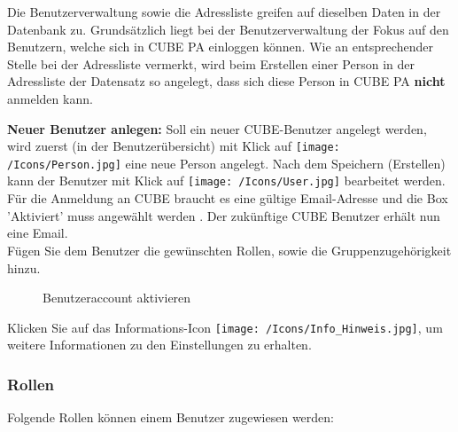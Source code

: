 Die Benutzerverwaltung sowie die Adressliste greifen auf dieselben Daten in der Datenbank zu. Grundsätzlich liegt bei der Benutzerverwaltung der Fokus auf den Benutzern, welche sich in CUBE PA einloggen können. Wie an entsprechender Stelle bei der Adressliste vermerkt, wird beim Erstellen einer Person in der Adressliste der Datensatz so angelegt, dass sich diese Person in CUBE PA \textbf{nicht} anmelden kann. 

\vspace{\baselineskip}

\textbf{Neuer Benutzer anlegen:} Soll ein neuer CUBE-Benutzer angelegt werden, wird zuerst (in der Benutzerübersicht) mit Klick auf \texttt{[image: /Icons/Person.jpg]} eine neue Person angelegt. Nach dem Speichern (Erstellen) kann der Benutzer mit Klick auf \texttt{[image: /Icons/User.jpg]} bearbeitet werden. Für die Anmeldung an CUBE braucht es eine gültige Email-Adresse und die Box 'Aktiviert' muss angewählt werden . Der zukünftige CUBE Benutzer erhält nun eine Email.\\
Fügen Sie dem Benutzer die gewünschten Rollen, sowie die Gruppenzugehörigkeit hinzu.

\begin{figure}[H]
\caption{Benutzeraccount aktivieren}
\end{figure}

Klicken Sie auf das Informations-Icon \texttt{[image: /Icons/Info\_Hinweis.jpg]}, um weitere Informationen zu den Einstellungen zu erhalten.

\vspace{-10pt}

\clearpage
\subsubsection{Rollen}
\label{bkm:Ref445361985}

Folgende Rollen können einem Benutzer zugewiesen werden:

\vspace{\baselineskip}

